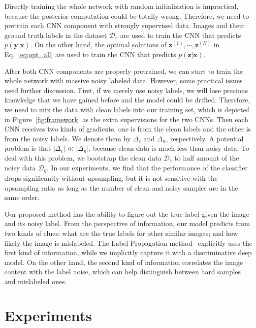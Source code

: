 \documentclass[10pt,twocolumn,letterpaper]{article}
\def\vec{\mathbf}
\begin{document}
Directly training the whole network with random initialization is impractical, because the posterior computation could be totally wrong. Therefore, we need to pretrain each CNN component with strongly supervised data. Images and their ground truth labels in the dataset $\mathcal{D}_c$ are used to train the CNN that predicts $p(\vec{y}|\vec{x})$. On the other hand, the optimal solutions of $\vec{z}^{(1)},\cdots,\vec{z}^{(N)}$ in Eq.~\eqref{eq:opt_all} are used to train the CNN that predicts $p(\vec{z}|\vec{x})$.

After both CNN components are properly pretrained, we can start to train the whole network with massive noisy labeled data. However, some practical issues need further discussion. First, if we merely use noisy labels, we will lose precious knowledge that we have gained before and the model could be drifted. Therefore, we need to mix the data with clean labels into our training set, which is depicted in Figure~\ref{fig:framework} as the extra supervisions for the two CNNs. Then each CNN receives two kinds of gradients, one is from the clean labels and the other is from the noisy labels. We denote them by $\Delta_c$ and $\Delta_n$, respectively. A potential problem is that $|\Delta_c| \ll |\Delta_n|$, because clean data is much less than noisy data. To deal with this problem, we bootstrap the clean data $\mathcal{D}_c$ to half amount of the noisy data $\mathcal{D}_{\eta}$. In our experiments, we find that the performance of the classifier drops significantly without upsampling, but it is not sensitive with the upsampling ratio as long as the number of clean and noisy samples are in the same order.

Our proposed method has the ability to figure out the true label given the image and its noisy label. From the perspective of information, our model predicts from two kinds of clues: what are the true labels for other similar images; and how likely the image is mislabeled. The Label Propagation method~\cite{zhu2002learning} explicitly uses the first kind of information, while we implicitly capture it with a discriminative deep model. On the other hand, the second kind of information correlates the image content with the label noise, which can help distinguish between hard samples and mislabeled ones.

\section{Experiments} %
\label{sec:experiments}
\end{document}
